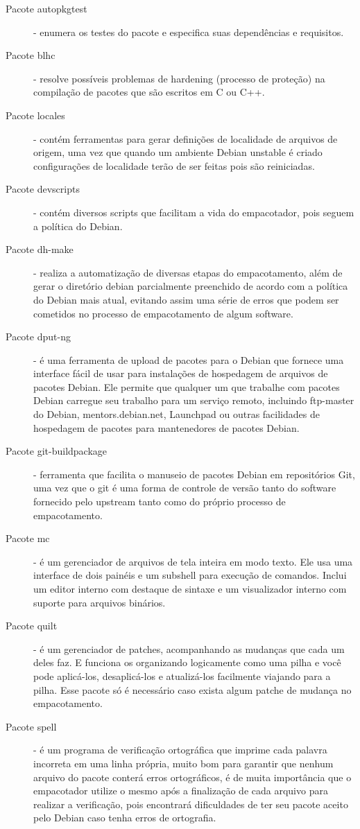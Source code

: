 \begin{description}
	\item[Pacote autopkgtest] - enumera os testes do pacote e especifica suas dependências e requisitos.
	\item[Pacote blhc] - resolve possíveis problemas de hardening (processo de proteção) na compilação de pacotes que são escritos em C ou C++.
	\item[Pacote locales] - contém ferramentas para gerar definições de localidade de arquivos de origem, uma vez que quando um ambiente Debian unstable é criado configurações de localidade terão de ser feitas pois são reiniciadas.
	\item[Pacote devscripts] - contém diversos scripts que facilitam a vida do empacotador, pois seguem a política do Debian.
	\item[Pacote dh-make] - realiza a automatização de diversas etapas do empacotamento, além de gerar o diretório debian parcialmente preenchido de acordo com a política do Debian mais atual, evitando assim uma série de erros que podem ser cometidos no processo de empacotamento de algum software.
	\item[Pacote dput-ng] - é uma ferramenta de upload de pacotes para o Debian que fornece uma interface fácil de usar para instalações de hospedagem de arquivos de pacotes Debian. Ele permite que qualquer um que trabalhe com pacotes Debian carregue seu trabalho para um serviço remoto, incluindo ftp-master do Debian, mentors.debian.net, Launchpad ou outras facilidades de hospedagem de pacotes para mantenedores de pacotes Debian.
	\item[Pacote git-buildpackage] - ferramenta que facilita o manuseio de pacotes Debian em repositórios Git, uma vez que o git é uma forma de controle de versão tanto do software fornecido pelo upstream tanto como do próprio processo de empacotamento.
	\item[Pacote mc] - é um gerenciador de arquivos de tela inteira em modo texto. Ele usa uma interface de dois painéis e um subshell para execução de comandos. Inclui um editor interno com destaque de sintaxe e um visualizador interno com suporte para arquivos binários.
	\item[Pacote quilt] - é um gerenciador de patches, acompanhando as mudanças que cada um deles faz. E funciona os organizando logicamente como uma pilha e você pode aplicá-los, desaplicá-los e atualizá-los facilmente viajando para a pilha. Esse pacote só é necessário caso exista algum patche de mudança no empacotamento.
	\item[Pacote spell] - é um programa de verificação ortográfica que imprime cada palavra incorreta em uma linha própria, muito bom para garantir que nenhum arquivo do pacote conterá erros ortográficos, é de muita importância que o empacotador utilize o mesmo após a finalização de cada arquivo para realizar a verificação, pois encontrará dificuldades de ter seu pacote aceito pelo Debian caso tenha erros de ortografia.

\end{description}
